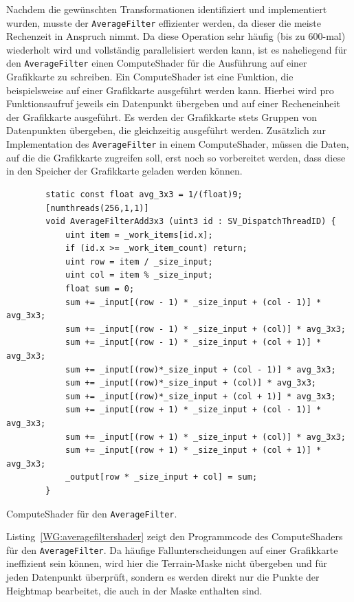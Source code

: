 Nachdem die gewünschten Transformationen identifiziert und implementiert wurden, musste der \texttt{AverageFilter} effizienter werden, da dieser die meiste Rechenzeit in Anspruch nimmt.
Da diese Operation sehr häufig (bis zu 600-mal) wiederholt wird und vollständig parallelisiert werden kann, ist es naheliegend für den \texttt{AverageFilter} einen ComputeShader für die Ausführung auf einer Grafikkarte zu schreiben.
Ein ComputeShader ist eine Funktion, die beispielsweise auf einer Grafikkarte ausgeführt werden kann.
Hierbei wird pro Funktionsaufruf jeweils ein Datenpunkt übergeben und auf einer Recheneinheit der Grafikkarte ausgeführt.
Es werden der Grafikkarte stets Gruppen von Datenpunkten übergeben, die gleichzeitig ausgeführt werden.
Zusätzlich zur Implementation des \texttt{AverageFilter} in einem ComputeShader, müssen die Daten, auf die die Grafikkarte zugreifen soll, erst noch so vorbereitet werden, dass diese in den Speicher der Grafikkarte geladen werden können.
\begin{listing}
    \begin{verbatim}
        static const float avg_3x3 = 1/(float)9;
        [numthreads(256,1,1)]
        void AverageFilterAdd3x3 (uint3 id : SV_DispatchThreadID) {
            uint item = _work_items[id.x];
            if (id.x >= _work_item_count) return;
            uint row = item / _size_input;
            uint col = item % _size_input;
            float sum = 0;
            sum += _input[(row - 1) * _size_input + (col - 1)] * avg_3x3;
            sum += _input[(row - 1) * _size_input + (col)] * avg_3x3;
            sum += _input[(row - 1) * _size_input + (col + 1)] * avg_3x3;
            sum += _input[(row)*_size_input + (col - 1)] * avg_3x3;
            sum += _input[(row)*_size_input + (col)] * avg_3x3;
            sum += _input[(row)*_size_input + (col + 1)] * avg_3x3;
            sum += _input[(row + 1) * _size_input + (col - 1)] * avg_3x3;
            sum += _input[(row + 1) * _size_input + (col)] * avg_3x3;
            sum += _input[(row + 1) * _size_input + (col + 1)] * avg_3x3;
            _output[row * _size_input + col] = sum;
        }
    \end{verbatim}
    \caption{ComputeShader für den \texttt{AverageFilter}.}
    \label{WG:averagefiltershader}
\end{listing}
Listing~\ref{WG:averagefiltershader} zeigt den Programmcode des ComputeShaders für den \texttt{AverageFilter}.
Da häufige Fallunterscheidungen auf einer Grafikkarte ineffizient sein können, wird hier die Terrain-Maske nicht übergeben und für jeden Datenpunkt überprüft, sondern es werden direkt nur die Punkte der Heightmap bearbeitet, die auch in der Maske enthalten sind.

